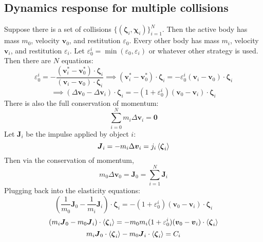 \documentclass[10pt]{report}
\begin{document}
\subsection{Dynamics response for multiple collisions}
Suppose there is a set of collisions $\{(\boldsymbol{\zeta}_i,\boldsymbol{\chi}_i)\}_{i=1}^N$. Then the active body has mass $m_0$, velocity $\boldsymbol{v}_0$, and restitution $\varepsilon_0$. Every other body has mass $m_i$, velocity $\boldsymbol{v}_i$, and restitution $\varepsilon_i$. Let $\varepsilon_0^i=\min(\varepsilon_0,\varepsilon_i)$ or whatever other strategy is used. Then there are $N$ equations:
\begin{equation}\varepsilon_0^i=-\frac{(\boldsymbol{v}_i^*-\boldsymbol{v}_0^*)\cdot\boldsymbol{\zeta}_i}{(\boldsymbol{v}_i-\boldsymbol{v}_0)\cdot\boldsymbol{\zeta}_i}\implies(\boldsymbol{v}_i^*-\boldsymbol{v}_0^*)\cdot\boldsymbol{\zeta}_i=-\varepsilon_0^i(\boldsymbol{v}_i-\boldsymbol{v}_0)\cdot\boldsymbol{\zeta}_i\end{equation}
\begin{equation}\implies(\Delta\boldsymbol{v}_0-\Delta\boldsymbol{v}_i)\cdot\boldsymbol{\zeta}_i=-(1+\varepsilon_0^i)(\boldsymbol{v}_0-\boldsymbol{v}_i)\cdot\boldsymbol{\zeta}_i\end{equation}
There is also the full conservation of momentum:
\begin{equation}\sum_{i=0}^Nm_i\Delta\boldsymbol{v}_i=\boldsymbol{0}\end{equation}
Let $\boldsymbol{J}_i$ be the impulse applied by object $i$:
\begin{equation}\boldsymbol{J}_i=-m_i\Delta\boldsymbol{v}_i=j_i\braket{\boldsymbol{\zeta}_i}\end{equation}
Then via the conservation of momentum,
\begin{equation}m_0\Delta\boldsymbol{v}_0=\boldsymbol{J}_0=\sum_{i=1}^N\boldsymbol{J}_i\end{equation}
Plugging back into the elasticity equations:
\begin{equation}(\frac{1}{m_0}\boldsymbol{J}_0-\frac{1}{m_i}\boldsymbol{J}_i)\cdot\boldsymbol{\zeta}_i=-(1+\varepsilon_0^i)(\boldsymbol{v}_0-\boldsymbol{v}_i)\cdot\boldsymbol{\zeta}_i\end{equation}
\begin{equation}(m_i\boldsymbol{J}_0-m_0\boldsymbol{J}_i)\cdot\braket{\boldsymbol{\zeta}_i}=-m_0m_i(1+\varepsilon_0^i)(\boldsymbol{v}_0-\boldsymbol{v}_i)\cdot\braket{\boldsymbol{\zeta}_i}\end{equation}
\begin{equation}m_i\boldsymbol{J}_0\cdot\braket{\boldsymbol{\zeta}_i}-m_0\boldsymbol{J}_i\cdot\braket{\boldsymbol{\zeta}_i}=C_i\end{equation}
\end{document}
